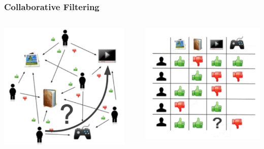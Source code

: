 \documentclass[11pt]{beamer}
\makeatletter
\def\tikzscale{1}\begin{lrbox}{\measure@tikzpicture}%
\edef\tikzscale{\pgfmathresult}%
\makeatother
\begin{document}
	\begin{frame}
		\frametitle{Collaborative Filtering}
		\begin{columns}
			\begin{column}{0.3\textwidth}
				\includegraphics[width=\textwidth]{images/cf-stage1.png}
			\end{column}\pause
			\begin{column}{0.05\textwidth}
				\begin{scaletikzpicturetowidth}{\textwidth}
				\end{scaletikzpicturetowidth}
			\end{column}
			\begin{column}{0.3\textwidth}
				\includegraphics[width=\textwidth]{images/cf-stage2.png}

\end{column}
\end{columns}
\end{frame}
\end{document}

